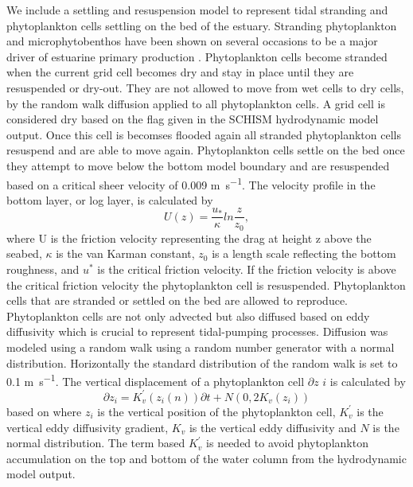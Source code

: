 \documentclass[npg, manuscript]{copernicus}
\begin{document}
We include a settling and resuspension model to represent tidal stranding and phytoplankton cells settling on the bed of the estuary.
Stranding phytoplankton and microphytobenthos have been shown on several occasions to be a major driver of estuarine primary production \citep{Carlson1984,DeJonge1992,Kromkamp1995,Savelli2019}.
Phytoplankton cells become stranded when the current grid cell becomes dry and stay in place until they are resuspended or dry-out. 
They are not allowed to move from wet cells to dry cells, by the random walk diffusion applied to all phytoplankton cells.
A grid cell is considered dry based on the flag given in the SCHISM  hydrodynamic model output.
Once this cell is becomses flooded again all stranded phytoplankton cells resuspend and are able to move again.
Phytoplankton cells settle on the bed once they attempt to move below the bottom model boundary and are resuspended based on a critical sheer velocity of 0.009 \unit{m s^{-1}}.
The velocity profile in the bottom layer, or log layer, is calculated by
\begin{equation}
    U(z) = \frac{u_{*}}{\kappa} ln \frac{z}{z_{0}},
\end{equation}
where U is the friction velocity representing the drag at height z  above the seabed, $\kappa$ is the van Karman constant, $z_{0}$ is a length
scale reflecting the bottom roughness, and $u^{*}$ is the critical friction velocity.
If the friction velocity is above the critical friction velocity the phytoplankton cell is resuspended.
Phytoplankton cells that are stranded or settled on the bed are allowed to reproduce.
Phytoplankton cells are not only advected but also diffused based on eddy diffusivity which is crucial to represent tidal-pumping processes.
Diffusion was modeled using a random walk using a random number generator with a normal distribution.
Horizontally the standard distribution of the random walk is set to 0.1 \unit{m s^{-1}}.
The vertical displacement of a phytoplankton cell $\partial z$  $i$ is calculated by
\begin{equation}
    \partial z_{i} = K_{v}^{'}(z_{i}(n))\partial t + N(0, 2K_{v}(z_{i}))
\end{equation}
based on \citet{Yamazaki2014} where $z_{i}$ is the vertical position of the phytoplankton cell, $K_{v}^{'}$ is the vertical eddy diffusivity gradient, $K_{v}$ is the vertical eddy diffusivity and $N$ is the normal distribution.
The term based $K_{v}^{'}$ is needed to avoid phytoplankton accumulation on the top and bottom of the water column from the hydrodynamic model output.
\end{document}
